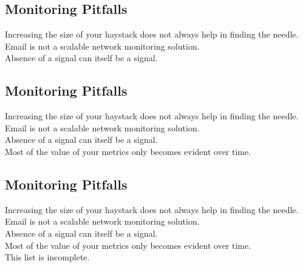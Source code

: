 \documentclass[xga]{xdvislides}
\begin{document}
\subsection{Monitoring Pitfalls}
\vspace*{\fill}
\Huge
\begin{center}
Increasing the size of your haystack does not always
help in finding the needle. \\
\vspace{.2in}
Email is not a scalable network monitoring solution. \\
\vspace{.2in}
Absence of a signal can itself be a signal.
\end{center}
\Normalsize
\vspace*{\fill}

\subsection{Monitoring Pitfalls}
\vspace*{\fill}
\Huge
\begin{center}
Increasing the size of your haystack does not always
help in finding the needle. \\
\vspace{.2in}
Email is not a scalable network monitoring solution. \\
\vspace{.2in}
Absence of a signal can itself be a signal. \\
\vspace{.2in}
Most of the value of your metrics only becomes evident
over time.
\end{center}
\Normalsize
\vspace*{\fill}

\subsection{Monitoring Pitfalls}
\vspace*{\fill}
\Huge
\begin{center}
Increasing the size of your haystack does not always
help in finding the needle. \\
\vspace{.2in}
Email is not a scalable network monitoring solution. \\
\vspace{.2in}
Absence of a signal can itself be a signal. \\
\vspace{.2in}
Most of the value of your metrics only becomes evident
over time. \\
\vspace{.2in}
This list is incomplete.
\end{center}
\Normalsize
\vspace*{\fill}
\end{document}
